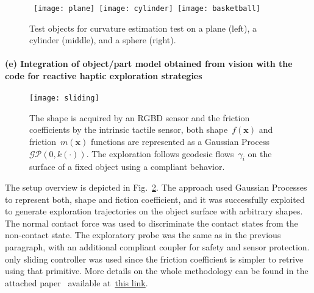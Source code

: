 \begin{figure}[!h]
    \centering
    \label{fig:curvature}
    \mbox{
    \texttt{[image: plane]}
    \texttt{[image: cylinder]}
    \texttt{[image: basketball]}
    }
    \caption{Test objects for curvature estimation test on a plane (left), a cylinder (middle), and a sphere (right).}
\end{figure}



\paragraph{(e) Integration of object/part model obtained from vision with the code for reactive haptic exploration strategies}

\begin{figure}[!b]
  \begin{center}
    \texttt{[image: sliding]}
  \end{center}
  \caption{The shape is acquired by an RGBD sensor and the friction coefficients by the intrinsic tactile sensor, both shape~$f(\mathbf{x})$ and friction~$m(\mathbf{x})$ functions are represented as a Gaussian Process $\mathcal{GP}(0,k(\cdot))$. The exploration follows geodesic flows~$\gamma_i$ on the surface of a fixed object using a compliant behavior.}
  \label{fig:schema}
\end{figure}

The setup overview is depicted in Fig.~\ref{fig:schema}. The approach used Gaussian Processes to represent both, shape and fiction coefficient, and it was successfully exploited to generate exploration trajectories on the object surface with arbitrary shapes. The normal contact force was used to discriminate the contact states from the non-contact state. The exploratory probe was the same as in the previous paragraph, with an additional compliant coupler for safety and sensor protection. only sliding controller was used since the friction coefficient is simpler to retrive using that primitive. More details on the whole methodology can be found in the attached paper~\cite{Active2014Rosales} available at~\href{./attachedPapers/ActiveGatheringOfFrictionalPropertiesFromObjects.pdf}{this link}.


